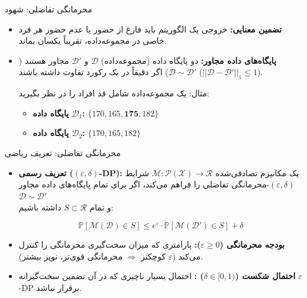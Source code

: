 \documentclass[10pt]{beamer}
\begin{document}
	
	\begin{frame}{محرمانگی تفاضلی: شهود}
		\begin{itemize}
			\item \textbf{تضمین معنایی:} خروجی یک الگوریتم باید فارغ از حضور یا عدم حضور هر فرد خاصی در مجموعه‌داده، تقریباً یکسان بماند.
			\vspace{0.3cm}
			\pause
			\vspace{0.7cm}
			\item \textbf{پایگاه‌های داده مجاور:} دو پایگاه داده (مجموعه‌داده) $\mathcal{D}$ و $\mathcal{D}'$ مجاور هستند ($\mathcal{D} \sim \mathcal{D}'$) 
			اگر دقیقاً در یک رکورد تفاوت داشته باشند ($||\mathcal{D} - \mathcal{D}'||_1 \le 1$).
			
			\pause
			
			\vspace{0.5cm}
			مثال: یک مجموعه‌داده شامل قد افراد را در نظر بگیرید:
			
			\begin{itemize}
				\vspace{0.2cm}
				\item \textbf{پایگاه داده $\mathcal{D}_1$:} $\{170, 165, \mathbf{175}, 182\}$
				\item \textbf{پایگاه داده $\mathcal{D}_2$:} $\{170, 165, 182\}$
			\end{itemize}
		\end{itemize}
	\end{frame}
	
	\begin{frame}{محرمانگی تفاضلی: تعریف ریاضی}
		\begin{itemize}
			\item \textbf{تعریف رسمی ($(\varepsilon, \delta)$-DP):} یک مکانیزم تصادفی‌شده $\mathcal{M}: \mathcal{P}(\mathcal{X}) \rightarrow \mathcal{R}$ شرایط $(\varepsilon, \delta)$-محرمانگی تفاضلی را فراهم می‌کند، اگر برای تمام پایگاه‌های داده مجاور $\mathcal{D} \sim \mathcal{D}'$ \\ و تمام $S \subset \mathcal{R}$ داشته باشیم:
			\vspace{0.2cm}
			\begin{block}{}
				
				\begin{equation*}
					\mathbb{P}[\mathcal{M}(\mathcal{D}) \in S] \le e^\varepsilon \cdot \mathbb{P}[\mathcal{M}(\mathcal{D}') \in S] + \delta
				\end{equation*}
				
			\end{block}
			\pause
			\vspace{0.2cm}
			\item \textbf{بودجه محرمانگی ($\varepsilon \geq 0$):} پارامتری که میزان سخت‌گیری محرمانگی را کنترل می‌کند ($\varepsilon$ کوچکتر $\Rightarrow$ محرمانگی قوی‌تر، نویز بیشتر).
			\item \textbf{احتمال شکست ($\delta \in [0,1)$) :} احتمال بسیار ناچیزی که در آن تضمین سخت‌گیرانه $\varepsilon$-DP برقرار نباشد.
		\end{itemize}
	\end{frame}
	
\end{document}
